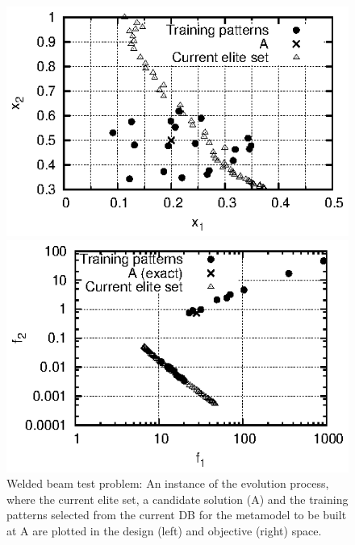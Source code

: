 \begin{figure}
\begin{minipage}{0.48\textwidth}
\includegraphics[scale=1.2]{IPE/x1_x2.eps}
\end{minipage}
\begin{minipage}{0.48\textwidth}
\includegraphics[scale=1.2]{IPE/f1_f2.eps}
\end{minipage}
\caption{Welded beam test problem: An instance of the evolution process, where the current elite set, a candidate solution (A) and the training patterns selected from the current DB for the metamodel to be built at A are plotted in the design (left) and objective (right) space.}
\label{fig:f1f2}
\end{figure}

